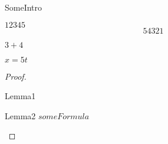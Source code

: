 \documentclass[11pt]{article}
\begin{document}
SomeIntro
\begin{theorem}
\begin{lemma}
$12345$$$54321$$
\end{lemma}
$3+4$
\end{theorem}
$x=5t$

\begin{proof}
\begin{lemma}
Lemma1
\end{lemma}
\begin{lemma}
Lemma2
$someFormula$
\end{lemma}
\end{proof}
\end{document}
